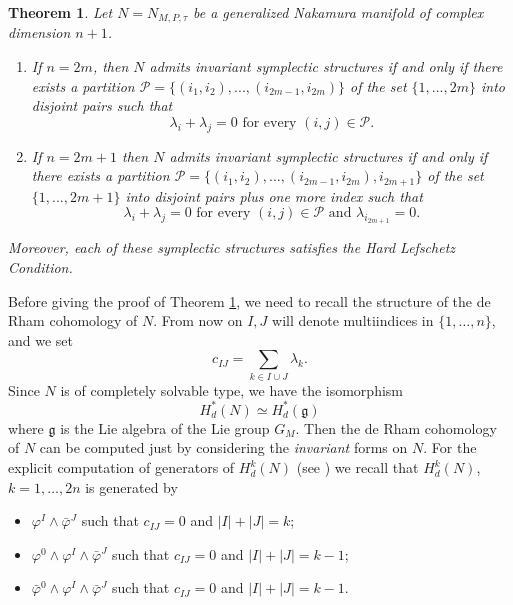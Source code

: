 \documentclass[a4paper, 11pt]{amsart}
\theoremstyle{plain}
\newtheorem{teorema}{Theorem} [section]
\theoremstyle{definition}
\numberwithin{equation}{section}
\begin{document}
\begin{teorema}\label{SimpletticheHLCGenNakamura}
    \setlength\itemsep{1em}
    Let $N = N_{M, P, \tau}$ be a generalized Nakamura manifold of complex dimension $n + 1$. 
    \begin{enumerate}
   \item If $n = 2m$, then $N$ admits invariant symplectic structures if and only if there exists a partition $\mathcal{P} = \{(i_1, i_2), ..., (i_{2m-1}, i_{2m})\}$ of the set $\{1, ..., 2m\}$ into disjoint pairs such that 
   \[\lambda_i + \lambda_j = 0 \text{ for every } (i, j) \in \mathcal{P}.\]
    \item If $n = 2m+1$ then $N$ admits invariant symplectic structures if and only if there exists a partition $\mathcal{P} = \{(i_1, i_2), ..., (i_{2m-1}, i_{2m}), i_{2m+1}\}$ of the set $\{1, ..., 2m+1\}$ into disjoint pairs plus one more index such that 
    \[\lambda_i + \lambda_j = 0 \text{ for every } (i, j) \in \mathcal{P} \text{ and } \lambda_{i_{2m+1}} = 0.\]
    \end{enumerate}
    Moreover, each of these symplectic structures satisfies the Hard Lefschetz Condition.
\end{teorema}
Before giving the proof of Theorem \ref{SimpletticheHLCGenNakamura}, we need to recall the structure of the de Rham cohomology of $N$. From now on $I, J$ will denote multiindices in $\{1, \ldots,n\}$, and we set 
\[c_{IJ} = \sum_{k \in I \cup J} \lambda_{k}.\]
Since $N$ is of completely solvable type, we have the isomorphism
\[H^{*}_d(N) \simeq H^{*}_d(\mathfrak{g})\]
where $\mathfrak{g}$ is the Lie algebra of the Lie group $G_{M}$. Then the de Rham cohomology of $N$ can be computed just by considering the \textit{invariant} forms on $N$. For the explicit computation of generators of $H^{k}_{d}(N)$ (see \cite[Proposition 4.12]{CT}) we recall that $H^{k}_{d}(N)$, $k = 1 ,\ldots,2n$ is generated by

     \begin{itemize}
        \item $\varphi^I \wedge \bar{\varphi}^J$ such that $c_{IJ} = 0$ and $|I| + |J| = k$;\\[1pt]
        \item $\varphi^0 \wedge \varphi^I \wedge \bar{\varphi}^J$ such that $c_{IJ} = 0$ and $|I| + |J| = k - 1$;\\[1pt]
        \item $\bar\varphi^0 \wedge \varphi^I \wedge \bar{\varphi}^J$ such that $c_{IJ} = 0$ and $|I| + |J| = k - 1$.
    \end{itemize}
\end{document}
